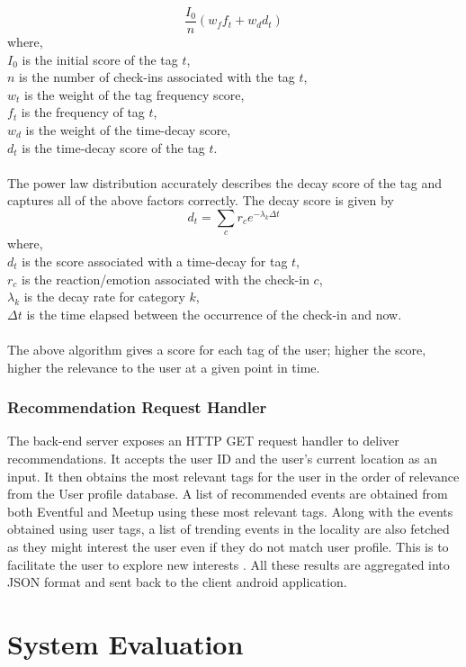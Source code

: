 \documentclass[12pt,letterpaper]{article}
\begin{document}
\[\frac{I_0}{n} \left( w_f f_t + w_d d_t \right) \]
where,\\
\(I_0\) is the initial score of the tag \(t\),\\
\(n\) is the number of check-ins associated with the tag \(t\),\\
\(w_t\) is the weight of the tag frequency score,\\
\(f_t\) is the frequency of tag \(t\),\\
\(w_d\) is the weight of the time-decay score,\\
\(d_t\) is the time-decay score of the tag \(t\).
\\\\
The power law distribution accurately describes the decay score of the tag and captures all of the above factors correctly. The decay score is given by 
\[d_t = \sum_{c} r_c e^{-\lambda _k \Delta t} \]
where,\\
\(d_t\) is the score associated with a time-decay for tag \(t\),\\
\(r_c\) is the reaction/emotion associated with the check-in \(c\),\\
\(\lambda_k\) is the decay rate for category \(k\),\\
\(\Delta t\) is the time elapsed between the occurrence of the check-in and now.
\\\\
The above algorithm gives a score for each tag of the user; higher the score, higher the relevance to the user at a given point in time.

\subsubsection{Recommendation Request Handler}
The back-end server exposes an HTTP GET request handler to deliver recommendations. It accepts the user ID and the user's current location as an input. It then obtains the most relevant tags for the user in the order of relevance from the User profile database. A list of recommended events are obtained from both Eventful and Meetup using these most relevant tags. Along with the events obtained using user tags, a list of trending events in the locality are also fetched as they might interest the user even if they do not match user profile. This is to facilitate the user to explore new interests . All these results are aggregated into JSON format and sent back to the client android application. 

\section{System Evaluation}
\end{document}
